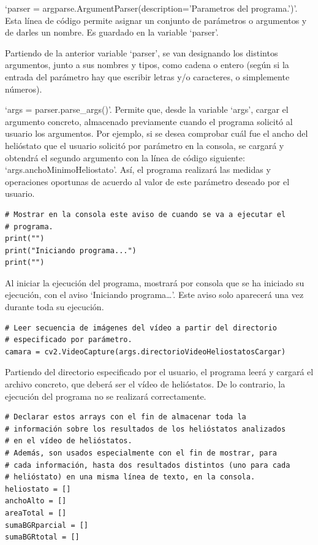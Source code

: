 ‘parser = argparse.ArgumentParser(description='Parametros del programa.')’. Esta línea de código permite asignar un conjunto de parámetros o argumentos y de darles un nombre. Es guardado en la variable ‘parser’.

Partiendo de la anterior variable ‘parser’, se van designando los distintos argumentos, junto a sus nombres y tipos, como cadena o entero (según si la entrada del parámetro hay que escribir letras y/o caracteres, o simplemente números).

‘args = parser.parse\_args()’. Permite que, desde la variable ‘args’, cargar el argumento concreto, almacenado previamente cuando el programa solicitó al usuario los argumentos. Por ejemplo, si se desea comprobar cuál fue el ancho del helióstato que el usuario solicitó por parámetro en la consola, se cargará y obtendrá el segundo argumento con la línea de código siguiente: ‘args.anchoMinimoHeliostato’. Así, el programa realizará las medidas y operaciones oportunas de acuerdo al valor de este parámetro deseado por el usuario.\\[20pt]

\begin{lstlisting}
# Mostrar en la consola este aviso de cuando se va a ejecutar el
# programa.
print("")
print("Iniciando programa...")
print("")
\end{lstlisting}

Al iniciar la ejecución del programa, mostrará por consola que se ha iniciado su ejecución, con el aviso ‘Iniciando programa…’. Este aviso solo aparecerá una vez durante toda su ejecución.\\[20pt]

\begin{lstlisting}
# Leer secuencia de imágenes del vídeo a partir del directorio
# especificado por parámetro.
camara = cv2.VideoCapture(args.directorioVideoHeliostatosCargar)
\end{lstlisting}

Partiendo del directorio especificado por el usuario, el programa leerá y cargará el archivo concreto, que deberá ser el vídeo de helióstatos. De lo contrario, la ejecución del programa no se realizará correctamente.\\[20pt]

\begin{lstlisting}
# Declarar estos arrays con el fin de almacenar toda la
# información sobre los resultados de los helióstatos analizados
# en el vídeo de helióstatos.
# Además, son usados especialmente con el fin de mostrar, para
# cada información, hasta dos resultados distintos (uno para cada
# helióstato) en una misma línea de texto, en la consola.
heliostato = []
anchoAlto = []
areaTotal = []
sumaBGRparcial = []
sumaBGRtotal = []
\end{lstlisting}


